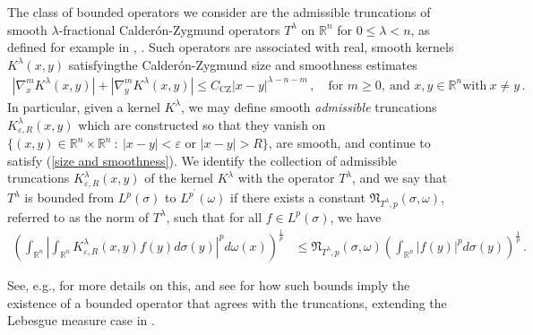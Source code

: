 \documentclass{amsart}%
\theoremstyle{plain}
\numberwithin{equation}{section}
\begin{document}
The class of bounded operators we consider are the
admissible truncations of smooth $\lambda$-fractional Calder\'{o}n-Zygmund
operators $T^{\lambda}$ on $\mathbb{R}^{n}$ for $0\leq\lambda<n$, as defined
for example in \cite[Section 2.1.2]{AlSaUr}, \cite{SaShUr9}. Such operators are associated
with real, smooth kernels $K^{\lambda}\left(  x,y\right)  $ satisfyingthe Calder\'on-Zygmund size and smoothness estimates
\begin{align} \label{size and smoothness}
  \left\vert \nabla_{x}^{m}K^{\lambda}\left(  x,y\right)  \right\vert
+\left\vert \nabla_{y}^{m}K^{\lambda}\left(  x,y\right)  \right\vert \leq
C_{\operatorname*{CZ}}\left\vert x-y\right\vert ^{\lambda-n-m} \, , \quad \text{for }m\geq0,\ \text{and }x,y\in\mathbb{R}^{n}\text{
with}\ x\neq y \, .
\end{align}
In particular, given a kernel $K^{\lambda}$, we may define smooth
\emph{admissible} truncations $K_{\varepsilon,R}^{\lambda}\left(  x,y\right)
$ which are constructed so that they vanish on $\{(x,y)\in\mathbb{R}%
^{n}\times\mathbb{R}^{n}~:~|x-y|<\varepsilon\text{ or }|x-y|>R\}$, are smooth,
and continue to satisfy (\ref{size and smoothness}). We identify
the collection of admissible truncations $K_{\varepsilon,R}^{\lambda}\left(
x,y\right)  $ of the kernel $K^{\lambda}$ with the operator $T^{\lambda}$, and we say that $T^{\lambda}$ is bounded from
$L^{p}\left(  \sigma\right)  $ to $L^{p^{\prime}}\left(  \omega\right)  $ if there exists a constant $\mathfrak{N}_{T^{\lambda},p}\left(  \sigma,\omega\right)$, referred to as the norm of $T^{\lambda}$, such that for all $f \in L^p \left (\sigma \right )$, we have
\begin{align*}
\left(  \int_{\mathbb{R}^{n}}\left\vert \int_{\mathbb{R}^{n}}K_{\varepsilon
,R}^{\lambda}\left(  x,y\right)  f\left(  y\right)  d\sigma\left(  y\right)
\right\vert ^{p}d\omega\left(  x\right)  \right)  ^{\frac{1}{p}} &
\leq\mathfrak{N}_{T^{\lambda},p}\left(  \sigma,\omega\right)  \left(
\int_{\mathbb{R}^{n}}\left\vert f\left(  y\right)  \right\vert ^{p}%
d\sigma\left(  y\right)  \right)  ^{\frac{1}{p}}\, .
\end{align*}

See, e.g., \cite{SaShUr9} for more details on this, and see \cite{Saw6} for how such bounds imply the
existence of a bounded operator that agrees with the truncations, extending the Lebesgue measure case in \cite{Ste2}.
\end{document}
